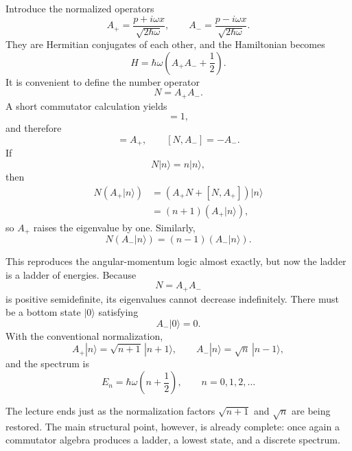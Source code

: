 Introduce the normalized operators
\begin{equation}
A_+=\frac{p+i\omega x}{\sqrt{2\hbar\omega}},\qquad
A_-=\frac{p-i\omega x}{\sqrt{2\hbar\omega}}.
\end{equation}
They are Hermitian conjugates of each other, and the Hamiltonian becomes
\begin{equation}
H=\hbar\omega\left(A_+A_-+\frac12\right).
\end{equation}
It is convenient to define the number operator
\begin{equation}
N=A_+A_-.
\end{equation}
A short commutator calculation yields
\begin{equation}
[A_-,A_+]=1,
\end{equation}
and therefore
\begin{equation}
[N,A_+]=A_+,\qquad [N,A_-]=-A_-.
\end{equation}
If
\begin{equation}
N|n\rangle=n|n\rangle,
\end{equation}
then
\begin{align}
N(A_+|n\rangle)
&=(A_+N+[N,A_+])|n\rangle \\
&=(n+1)(A_+|n\rangle),
\end{align}
so \(A_+\) raises the eigenvalue by one. Similarly,
\begin{equation}
N(A_-|n\rangle)=(n-1)(A_-|n\rangle).
\end{equation}

This reproduces the angular-momentum logic almost exactly, but now the ladder is a ladder of energies. Because
\begin{equation}
N=A_+A_-
\end{equation}
is positive semidefinite, its eigenvalues cannot decrease indefinitely. There must be a bottom state \(|0\rangle\) satisfying
\begin{equation}
A_-|0\rangle=0.
\end{equation}
With the conventional normalization,
\begin{equation}
A_+|n\rangle=\sqrt{n+1}\,|n+1\rangle,\qquad
A_-|n\rangle=\sqrt{n}\,|n-1\rangle,
\end{equation}
and the spectrum is
\begin{equation}
E_n=\hbar\omega\left(n+\frac12\right),\qquad n=0,1,2,\dots
\end{equation}

The lecture ends just as the normalization factors \(\sqrt{n+1}\) and \(\sqrt{n}\) are being restored. The main structural point, however, is already complete: once again a commutator algebra produces a ladder, a lowest state, and a discrete spectrum.

